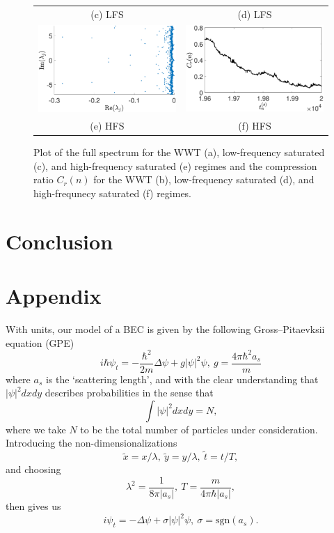 \documentclass[a4paper,11pt]{article}
\begin{document}
\begin{figure}[!ht]
\begin{tabular}{cc}
(c) LFS & (d) LFS\\
\includegraphics[width=.525\textwidth]{full_spec_hf_K_256_Lx_128_tf_2e4} &\hspace{-25pt} \includegraphics[width=.525\textwidth]{cratio_hfforce_K_256_Lx_128_tf_2e4}\\
(e) HFS & (f) HFS
\end{tabular}
\caption{Plot of the full spectrum for the WWT (a), low-frequency saturated (c), and high-frequency saturated (e) regimes and the compression ratio $C_{r}(n)$ for the WWT (b), low-frequency saturated (d), and high-frequnecy saturated (f) regimes.}
\label{fig:comprats}
\end{figure}

\section*{Conclusion}

\section*{Appendix}
With units, our model of a BEC is given by the following Gross--Pitaevksii equation (GPE)
\[
i\hbar\psi_{t} = -\frac{\hbar^{2}}{2m}\Delta \psi + g\left| \psi\right|^{2}\psi, ~ g = \frac{4\pi \hbar^{2}a_{s}}{m}
\]
where $a_{s}$ is the `scattering length', and with the clear understanding that $\left|\psi\right|^{2}dxdy$ describes probabilities in the sense that 
\[
\int |\psi|^{2}dxdy = N,
\]
where we take $N$ to be the total number of particles under consideration.  Introducing the non-dimensionalizations 
\[
\tilde{x} = x/\lambda, ~ \tilde{y} = y/\lambda, ~ \tilde{t} = t/T, 
\]
and choosing
\[
\lambda^{2} = \frac{1}{8\pi |a_{s}|}, ~ T = \frac{m}{4\pi\hbar |a_{s}|}, 
\] 
then gives us
\[
i\psi_{t} = -\Delta \psi + \sigma\left| \psi\right|^{2}\psi,  ~\sigma = \mbox{sgn}(a_{s}).
\]



\end{document}
